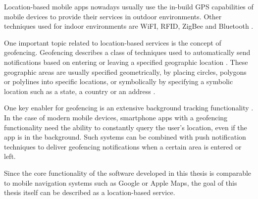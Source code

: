 Location-based mobile apps nowadays usually use the in-build GPS capabilities of mobile devices to provide their services in outdoor environments. Other techniques used for indoor environments are WiFI, RFID, ZigBee and Bluetooth \cite{Sadhukhan2021}.

One important topic related to location-based services is the concept of geofencing.
Geofencing describes a class of techniques used to automatically send notifications based on entering or leaving a specified geographic location \cite{geofencing}. These geographic areas are usually specified geometrically, by placing circles, polygons or polylines into specific locations, or symbolically by specifying a symbolic location such as a state, a country or an address \cite{geofencing}.

One key enabler for geofencing is an extensive background tracking functionality \cite{geofencing_and_background_tracking}. In the case of modern mobile devices, smartphone apps with a geofencing functionality need the ability to constantly query the user's location, even if the app is in the background. Such systems can be combined with push notification techniques to deliver geofencing notifications when a certain area is entered or left.

Since the core functionality of the software developed in this thesis is comparable to mobile navigation systems such as Google or Apple Maps, the goal of this thesis itself can be described as a location-based service.

